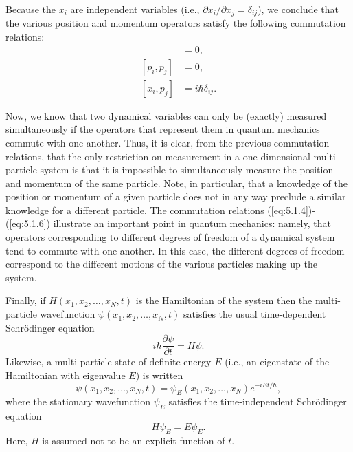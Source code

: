 Because the $x_{i}$ are independent variables (i.e., $\partial x_{i}/\partial x_{j} = \delta_{ij}$), we conclude that the various position and momentum operators satisfy the following commutation relations:
\begin{align}
	[x_i, x_j] &= 0, \label{eq:5.1.4} \\
	[p_i, p_j] &= 0, \label{eq:5.1.5} \\
	[x_i, p_j] &= i\hbar \delta_{ij}. \label{eq:5.1.6}
\end{align}

Now, we know that two dynamical variables can only be (exactly) measured simultaneously if the operators that represent them in quantum mechanics commute with one another. Thus, it is clear, from the previous commutation relations, that the only restriction on measurement in a one-dimensional multi-particle system is that it is impossible to simultaneously measure the position and momentum of the same particle. Note, in particular, that a knowledge of the position or momentum of a given particle does not in any way preclude a similar knowledge for a different particle. The commutation relations (\ref{eq:5.1.4})-(\ref{eq:5.1.6}) illustrate an important point in quantum mechanics: namely, that operators corresponding to different degrees of freedom of a dynamical system tend to commute with one another. In this case, the different degrees of freedom correspond to the different motions of the various particles making up the system.

Finally, if $H(x_{1}, x_{2},\ldots, x_{N}, t)$ is the Hamiltonian of the system then the multi-particle wavefunction $\psi(x_{1}, x_{2},\ldots, x_{N}, t)$ satisfies the usual time-dependent Schrödinger equation
\begin{equation}
	i\hbar\frac{\partial\psi}{\partial t} = H\psi.
	\label{eq:5.1.7}
\end{equation}
Likewise, a multi-particle state of definite energy $E$ (i.e., an eigenstate of the Hamiltonian with eigenvalue $E$) is written
\begin{equation}
	\psi(x_{1}, x_{2},\ldots, x_{N}, t) = \psi_{E}(x_{1}, x_{2},\ldots, x_{N}) e^{-i E t/\hbar},
	\label{eq:5.1.8}
\end{equation}
where the stationary wavefunction $\psi_{E}$ satisfies the time-independent Schrödinger equation
\begin{equation}
	H\psi_E = E\psi_E.
	\label{eq:5.1.9}
\end{equation}
Here, $H$ is assumed not to be an explicit function of $t$.

